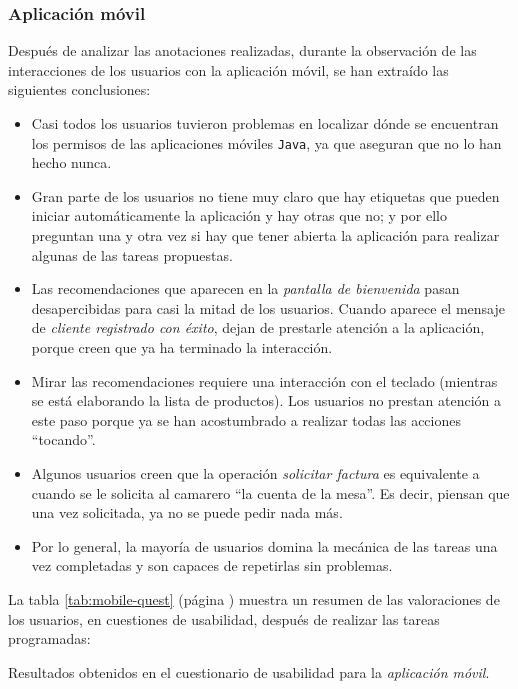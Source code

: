 \subsubsection{Aplicación móvil}
Después de analizar las anotaciones realizadas, durante la observación de las
interacciones de los usuarios con la aplicación móvil, se han extraído las
siguientes conclusiones:
\begin{itemize}
\item Casi todos los usuarios tuvieron problemas en localizar dónde se
encuentran los permisos de las aplicaciones móviles \texttt{Java}, ya que
aseguran que no lo han hecho nunca.
\item Gran parte de los usuarios no tiene muy claro que hay etiquetas que
pueden iniciar automáticamente la aplicación y hay otras que no; y por ello 
preguntan una y otra vez si hay que tener abierta la aplicación para realizar 
algunas de las tareas propuestas.
\item Las recomendaciones que aparecen en la \emph{pantalla de bienvenida}
pasan desapercibidas para casi la mitad de los usuarios. Cuando aparece el
mensaje de \emph{cliente registrado con éxito}, dejan de prestarle atención
a la aplicación, porque creen que ya ha terminado la interacción.
\item Mirar las recomendaciones requiere una interacción con el teclado
(mientras se está elaborando la lista de productos). Los usuarios no
prestan atención a este paso porque ya se han acostumbrado a realizar todas
las acciones ``tocando''.
\item Algunos usuarios creen que la operación \emph{solicitar factura} es
equivalente a cuando se le solicita al camarero ``la cuenta de la mesa''.
Es decir, piensan que una vez solicitada, ya no se puede pedir nada más.
\item Por lo general, la mayoría de usuarios domina la mecánica de las
tareas una vez completadas y son capaces de repetirlas sin problemas.
\end{itemize}

La tabla \ref{tab:mobile-quest} (página \pageref{tab:mobile-quest}) muestra un 
resumen de las valoraciones de los usuarios, en cuestiones de usabilidad, 
después de realizar las tareas programadas:

\begin{sidewaystable}[hp]
  \centering
  {\footnotesize
  
  }
  \caption[Resultados obtenidos en el cuestionario de usabilidad para 
  la \emph{aplicación móvil}.]{Resultados obtenidos en el cuestionario de
  usabilidad para la \emph{aplicación móvil}.}
  \label{tab:mobile-quest}
\end{sidewaystable}

